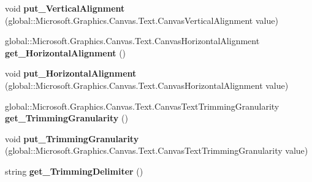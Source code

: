 \begin{DoxyCompactItemize}
\item 
\mbox{\label{interface_microsoft_1_1_graphics_1_1_canvas_1_1_text_1_1_i_canvas_text_format_a47eeac343ee56e937ea663d034a43e3f}} 
void {\bfseries put\+\_\+\+Vertical\+Alignment} (global\+::\+Microsoft.\+Graphics.\+Canvas.\+Text.\+Canvas\+Vertical\+Alignment value)
\item 
\mbox{\label{interface_microsoft_1_1_graphics_1_1_canvas_1_1_text_1_1_i_canvas_text_format_a8b95906a63861d6e560977db8b154cb6}} 
global\+::\+Microsoft.\+Graphics.\+Canvas.\+Text.\+Canvas\+Horizontal\+Alignment {\bfseries get\+\_\+\+Horizontal\+Alignment} ()
\item 
\mbox{\label{interface_microsoft_1_1_graphics_1_1_canvas_1_1_text_1_1_i_canvas_text_format_aa35da0e8e55810f44b20d72a857dc479}} 
void {\bfseries put\+\_\+\+Horizontal\+Alignment} (global\+::\+Microsoft.\+Graphics.\+Canvas.\+Text.\+Canvas\+Horizontal\+Alignment value)
\item 
\mbox{\label{interface_microsoft_1_1_graphics_1_1_canvas_1_1_text_1_1_i_canvas_text_format_a2db054de408def815030a08cc7d260fb}} 
global\+::\+Microsoft.\+Graphics.\+Canvas.\+Text.\+Canvas\+Text\+Trimming\+Granularity {\bfseries get\+\_\+\+Trimming\+Granularity} ()
\item 
\mbox{\label{interface_microsoft_1_1_graphics_1_1_canvas_1_1_text_1_1_i_canvas_text_format_a8024f0e16f1e45d41135c2f6848b2dca}} 
void {\bfseries put\+\_\+\+Trimming\+Granularity} (global\+::\+Microsoft.\+Graphics.\+Canvas.\+Text.\+Canvas\+Text\+Trimming\+Granularity value)
\item 
\mbox{\label{interface_microsoft_1_1_graphics_1_1_canvas_1_1_text_1_1_i_canvas_text_format_a465c8b167bfb7c8dd79219d09f74a2ab}} 
string {\bfseries get\+\_\+\+Trimming\+Delimiter} ()
\item 
\mbox{\label{interface_microsoft_1_1_graphics_1_1_canvas_1_1_text_1_1_i_canvas_text_format_ad1fbe65d5abfd8c79af18f07b497a1fd}} 

\end{DoxyCompactItemize}
